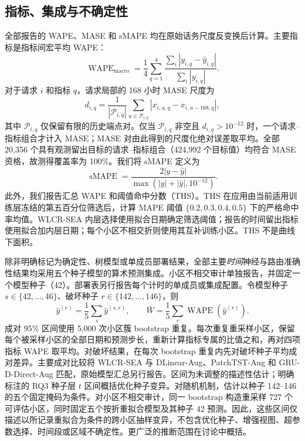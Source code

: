 \documentclass[10pt,conference,letterpaper]{IEEEtran}
\newcommand{\method}{WLCR-SEA}
\begin{document}
\subsection{指标、集成与不确定性}
全部报告的 WAPE、MASE 和 sMAPE 均在原始话务尺度反变换后计算。主要指标是指标间宏平均 WAPE：
\begin{equation}
\operatorname{WAPE}_{\mathrm{macro}}=
\frac14\sum_{q=1}^{4}
\frac{\sum_i|y_{i,q}-\widehat y_{i,q}|}{\sum_i|y_{i,q}|}.
\end{equation}
对于请求 $i$ 和指标 $q$，请求局部的 168 小时 MASE 尺度为
\begin{equation}
d_{i,q}=\frac{1}{|\mathcal P_{i,q}|}\sum_{u\in\mathcal P_{i,q}}
|x_{i,u,q}-x_{i,u-168,q}|,
\end{equation}
其中 $\mathcal P_{i,q}$ 仅保留有限的历史端点对。仅当 $\mathcal P_{i,q}$ 非空且 $d_{i,q}>10^{-12}$ 时，一个请求--指标组合才计入 MASE；MASE 对由此得到的尺度化绝对误差取平均。全部 20,356 个具有观测留出目标的请求--指标组合（424,992 个目标值）均符合 MASE 资格，故测得覆盖率为 100\%。我们将 sMAPE 定义为
\begin{equation}
\operatorname{sMAPE}=\frac{2|y-\widehat y|}{\max(|y|+|\widehat y|,10^{-12})}.
\end{equation}
此外，我们报告汇总 WAPE 和阈值命中分数（THS）。THS 在应用由当前适用训练层冻结的第五百分位筛选后，计算 MAPE 阈值 $\{0.2,0.3,0.4,0.5\}$ 下的严格命中率均值。WLCR-SEA 内层选择使用拟合日期确定筛选阈值；报告的时间留出指标使用拟合加内层日期；每个小区不相交折则使用其互补训练小区。THS 不是曲线下面积。

除非明确标记为确定性、树模型或单成员部署结果，全部主要\emph{时间}神经与路由准确性结果均采用五个种子模型的算术预测集成。小区不相交审计单独报告，并固定一个模型种子（42）。部署表另行报告每个计时的单成员或集成配置。令模型种子 $s\in\{42,\ldots,46\}$、破坏种子 $r\in\{142,\ldots,146\}$，则
\begin{equation}
\widehat y^{(r)}=\frac15\sum_s\widehat y^{(s,r)},\qquad
\bar W=\frac15\sum_r\operatorname{WAPE}(\widehat y^{(r)}).
\end{equation}
成对 95\% 区间使用 5,000 次小区簇 bootstrap 重复。每次重复重采样小区，保留每个被采样小区的全部日期和预测步长，重新计算指标专属的比值之和，再对四项指标 WAPE 取平均。对破坏结果，在每次 bootstrap 重复内先对破坏种子平均成对差异。主要成对比较将 \method{} 与 DLinear-Aug、PatchTST-Aug 和 GRU-D-Direct-Aug 匹配，原始模型汇总另行报告。区间为未调整的描述性估计；明确标注的 RQ3 种子层 $t$ 区间概括优化种子变异。对随机机制，估计以种子 142--146 的五个固定掩码为条件。对小区不相交审计，同一 bootstrap 构造重采样 727 个可评估小区，同时固定五个按折重拟合模型及其种子 42 预测。因此，这些区间仅描述以所记录重拟合为条件的跨小区抽样变异，不包含优化种子、增强视图、超参数选择、时间段或区域不确定性。更广泛的推断范围在讨论中概括。
\end{document}
